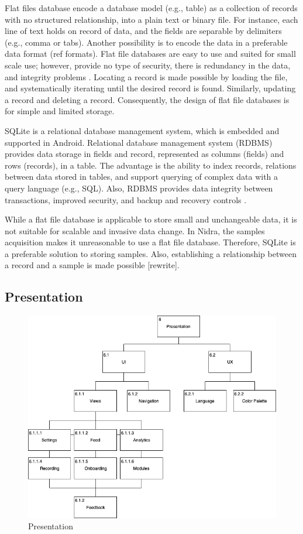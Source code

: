 Flat files database encode a database model (e.g., table) as a collection of records with no structured relationship, into a plain text or binary file. For instance, each line of text holds on record of data, and the fields are separable by delimiters (e.g., comma or tabs). Another possibility is to encode the data in a preferable data format (ref formats). Flat file databases are easy to use and suited for small scale use; however, provide no type of security, there is redundancy in the data, and integrity problems \cite{flatfilerdbms}. Locating a record is made possible by loading the file, and systematically iterating until the desired record is found. Similarly, updating a record and deleting a record. Consequently, the design of flat file databases is for simple and limited storage.

SQLite is a relational database management system, which is embedded and supported in Android. Relational database management system (RDBMS) provides data storage in fields and record, represented as columns (fields) and rows (records), in a table. The advantage is the ability to index records, relations between data stored in tables, and support querying of complex data with a query language (e.g., SQL). Also, RDBMS provides data integrity between transactions, improved security, and backup and recovery controls \cite{flatfilerdbms}. 

While a flat file database is applicable to store small and unchangeable data, it is not suitable for scalable and invasive data change. In Nidra, the samples acquisition makes it unreasonable to use a flat file database. Therefore, SQLite is a preferable solution to storing samples. Also, establishing a relationship between a record and a sample is made possible [rewrite]. 

\subsection{Presentation}
\begin{figure}
    \centering
    \includegraphics[scale=0.5]{images/Presentation.png}
    \caption{Presentation}
    \label{fig:hta_presentation}
\end{figure}

